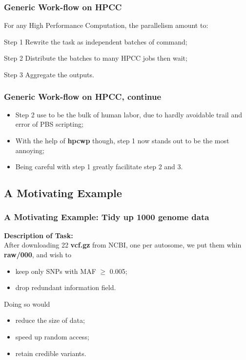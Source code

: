 \documentclass{beamer}
\begin{document}


\begin{frame}
\frametitle{Generic Work-flow on HPCC}
For any High Performance Computation, the parallelism amount to:
\begin{block}{Step 1}
Rewrite the task as independent batches of command;
\end{block}

\begin{block}{Step 2}
Distribute the batches to many HPCC jobs then wait;
\end{block}

\begin{block}{Step 3}
Aggregate the outputs.
\end{block}
\end{frame}


\begin{frame}
\frametitle{Generic Work-flow on HPCC, continue}
\begin{itemize}
\item Step 2 use to be the bulk of human labor, due to hardly avoidable trail and error of PBS scripting;
\item With the help of \textbf{hpcwp} though, step 1 now stands out to be the most annoying;
\item Being careful with step 1 greatly facilitate step 2 and 3.
\end{itemize}

\end{frame}

\subsection{A Motivating Example}
\begin{frame}
\frametitle{A Motivating Example: Tidy up 1000 genome data}

\textbf{Description of Task:} \\
After downloading 22 \textbf{vcf.gz} from NCBI, one per autosome, we put them whin
\textbf{raw/000}, and wish to
\begin{itemize}
\item keep only SNPs with MAF \(\ge\) 0.005;
\item drop redundant information field.
\end{itemize}
Doing so would
\begin{itemize}
\item reduce the size of data;
\item speed up random access;
\item retain credible variants.
\end{itemize}
\end{frame}
\end{document}
